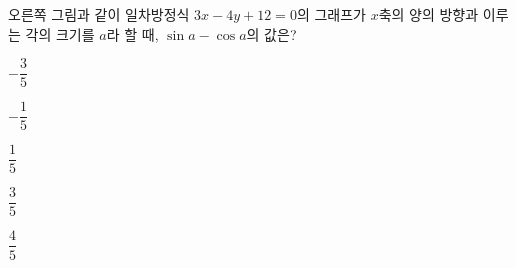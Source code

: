 \noindent\begin{minipage}[t]{0.58\linewidth}\vspace{0pt}\raggedright 오른쪽 그림과 같이 일차방정식 $3x-4y+12=0$의 그래프가 $x$축의 양의 방향과 이루는 각의 크기를 $a$라 할 때, $\sin a-\cos a$의 값은?\end{minipage}\hfill\begin{minipage}[t]{0.4\linewidth}\vspace{0pt}\centering \resizebox{\ifdim\width>\linewidth\linewidth\else\width\fi}{!}{}\end{minipage}\par
\begin{choices32}{\rule[-3ex]{0pt}{8ex}$-\dfrac{3}{5}$}{\rule[-3ex]{0pt}{8ex}$-\dfrac{1}{5}$}{\rule[-3ex]{0pt}{8ex}$\dfrac{1}{5}$}{\rule[-3ex]{0pt}{8ex}$\dfrac{3}{5}$}{\rule[-3ex]{0pt}{8ex}$\dfrac{4}{5}$}\end{choices32}
